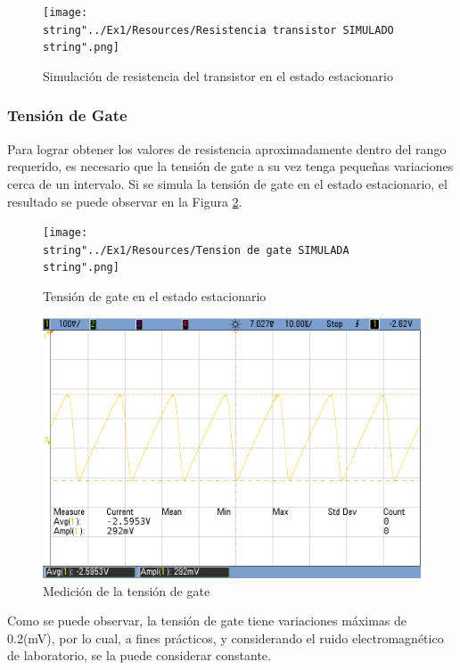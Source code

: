 \begin{figure}[H]
\begin{centering}
\texttt{[image: \\string"../Ex1/Resources/Resistencia transistor SIMULADO\\string".png]}
\par\end{centering}
\caption{Simulación de resistencia del transistor en el estado estacionario}
\label{1_14}

\end{figure}

\subsubsection{Tensión de Gate}

Para lograr obtener los valores de resistencia aproximadamente dentro
del rango requerido, es necesario que la tensión de gate a su vez
tenga pequeñas variaciones cerca de un intervalo. Si se simula la
tensión de gate en el estado estacionario, el resultado se puede observar
en la Figura \ref{1_15}.

\begin{figure}[H]
\begin{centering}
\texttt{[image: \\string"../Ex1/Resources/Tension de gate SIMULADA\\string".png]}
\par\end{centering}
\caption{Tensión de gate en el estado estacionario}

\label{1_15}
\end{figure}

\begin{figure}[H]
\begin{centering}
\includegraphics[scale=0.35]{../Ex1/Resources/VG}
\par\end{centering}
\caption{Medición de la tensión de gate}

\end{figure}

Como se puede observar, la tensión de gate tiene variaciones máximas
de 0.2(mV), por lo cual, a fines prácticos, y considerando el ruido
electromagnético de laboratorio, se la puede considerar constante.
